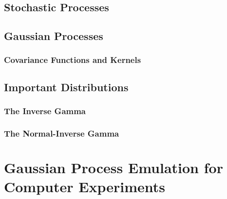 \documentclass[12pt]{article}
\begin{document}
\subsection{Stochastic Processes}

\subsection{Gaussian Processes}
\subsubsection{Covariance Functions and Kernels}

\subsection{Important Distributions}
\subsubsection{The Inverse Gamma}

\subsubsection{The Normal-Inverse Gamma}


\section{Gaussian Process Emulation for Computer Experiments}
\end{document}
